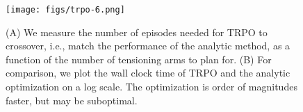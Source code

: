 \begin{figure}[ht]
\texttt{[image: figs/trpo-6.png]}
\caption{(A) We measure the number of episodes needed for TRPO to crossover, i.e., match the performance of the analytic method, as a function of the number of tensioning arms to plan for. (B) For comparison, we plot the wall clock time of TRPO and the analytic optimization on a log scale. The optimization is order of magnitudes faster, but may be suboptimal. \label{fig:2}}
\end{figure}